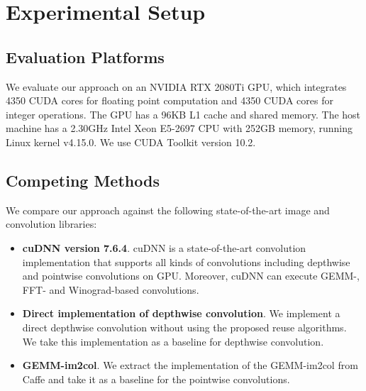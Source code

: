 

\section{Experimental Setup}

\subsection{Evaluation Platforms} We evaluate our approach on an NVIDIA RTX 2080Ti GPU, which integrates 4350 CUDA cores for floating
point computation  and 4350 CUDA cores for integer operations. The GPU has a 96KB L1 cache and shared memory. The host machine has a 2.30GHz
Intel Xeon E5-2697 CPU with 252GB memory, running Linux kernel v4.15.0. We use CUDA Toolkit version 10.2.


\subsection{Competing Methods} We compare our approach against the following state-of-the-art image and convolution libraries:
\begin{itemize}
  \item \textbf{cuDNN version 7.6.4}. cuDNN is a state-of-the-art convolution implementation that supports all kinds of convolutions including depthwise and pointwise convolutions on GPU. 
  Moreover, cuDNN can execute GEMM-, FFT- and Winograd-based convolutions.
  \item \textbf{Direct implementation of depthwise convolution}. We implement a direct depthwise convolution without using the proposed reuse algorithms. We take this implementation as a baseline for depthwise convolution.
  \item \textbf{GEMM-im2col}. We extract the implementation of the GEMM-im2col from Caffe \cite{jia2014caffe} and take it as a baseline
      for the pointwise convolutions.
\end{itemize}

